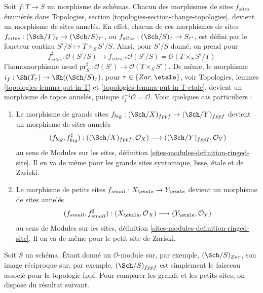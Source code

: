 \begin{remark}
\label{remark-change-topologies-ringed}
Soit $f : T \to S$ un morphisme de schémas.
Chacun des morphismes de sites $f_{sites}$ énumérés dans
Topologies, section \ref{topologies-section-change-topologies},
devient un morphisme de sites annelés. En effet, chacun de ces morphismes de sites
$f_{sites} : (\Sch/T)_\tau \to (\Sch/S)_{\tau'}$, ou
$f_{sites} : (\Sch/S)_\tau \to S_{\tau'}$, est défini par le foncteur
continu $S'/S \mapsto T \times_S S'/S$. Ainsi, pour $S'/S$ donné, on prend pour
$$
f_{sites}^\sharp :
\mathcal{O}(S'/S)
\longrightarrow
f_{sites, *}\mathcal{O}(S'/S) =
\mathcal{O}(T \times_S S'/T)
$$
l'homomorphisme usuel
$\text{pr}_{S'}^\sharp : \mathcal{O}(S') \to \mathcal{O}(T \times_S S')$.
De même, le morphisme
$i_f : \Sh(T_\tau) \to \Sh((\Sch/S)_\tau)$,
pour $\tau \in \{Zar, \etale\}$, voir
Topologies, lemmes \ref{topologies-lemma-put-in-T} et
\ref{topologies-lemma-put-in-T-etale},
devient un morphisme de topos annelés, puisque $i_f^{-1}\mathcal{O} = \mathcal{O}$.
Voici quelques cas particuliers :
\begin{enumerate}
\item Le morphisme de grands sites
$f_{big} : (\Sch/X)_{fppf} \to (\Sch/Y)_{fppf}$
devient un morphisme de sites annelés
$$
(f_{big}, f_{big}^\sharp) :
((\Sch/X)_{fppf}, \mathcal{O}_X)
\longrightarrow
((\Sch/Y)_{fppf}, \mathcal{O}_Y)
$$
au sens de Modules sur les sites, définition \ref{sites-modules-definition-ringed-site}.
Il en va de même pour les grands sites syntomique, lisse, \'etale et de Zariski.
\item Le morphisme de petits sites
$f_{small} : X_\etale \to Y_\etale$
devient un morphisme de sites annelés
$$
(f_{small}, f_{small}^\sharp) :
(X_\etale, \mathcal{O}_X)
\longrightarrow
(Y_\etale, \mathcal{O}_Y)
$$
au sens de Modules sur les sites, définition \ref{sites-modules-definition-ringed-site}.
Il en va de même pour le petit site de Zariski.
\end{enumerate}
\end{remark}

\noindent
Soit $S$ un schéma. Étant donné un $\mathcal{O}$-module sur, par exemple,
$(\Sch/S)_{Zar}$, son image réciproque sur, par exemple, $(\Sch/S)_{fppf}$
est simplement le faisceau associé pour la topologie fppf. Pour comparer
les grands et les petits sites, on dispose du résultat suivant.

